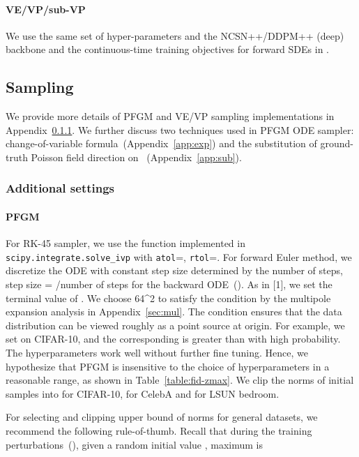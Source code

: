 \paragraph{VE/VP/sub-VP} We use the same set of hyper-parameters and the NCSN++/DDPM++ (deep) backbone and the continuous-time training objectives for forward SDEs in \cite{Song2021ScoreBasedGM}.

\subsection{Sampling}
\label{app:sampling}

We provide more details of PFGM and VE/VP sampling implementations in Appendix~\ref{app:sample-add}. We further discuss two techniques used in PFGM ODE sampler: change-of-variable formula~(Appendix~\ref{app:exp}) and the substitution of ground-truth Poisson field direction on ~(Appendix~\ref{app:sub}).


\subsubsection{Additional settings}
\label{app:sample-add}
\paragraph{PFGM} For RK-45 sampler, we use the function implemented in \texttt{scipy.integrate.solve\_ivp} with \texttt{atol}=, \texttt{rtol}=. For forward Euler method, we discretize the ODE with constant step size determined by the number of steps, \ie step size = /number of steps for the backward ODE~(). {As in [1], we set the terminal value of . We choose 64^2 to satisfy the condition  by the multipole expansion analysis in Appendix~\ref{sec:mul}. The condition ensures that the data distribution can be viewed roughly as a point source at origin. For example, we set  on CIFAR-10, and the corresponding  is greater than  with high probability. The hyperparameters work well without further fine tuning. Hence, we hypothesize that PFGM is insensitive to the choice of hyperparameters in a reasonable range, as shown in Table~\ref{table:fid-zmax}.} We clip the norms of initial samples into  for CIFAR-10,  for CelebA and  for LSUN bedroom.

For selecting  and clipping upper bound of norms for general datasets, we recommend the following rule-of-thumb. Recall that during the training perturbations~(), given a random initial value , maximum  is

